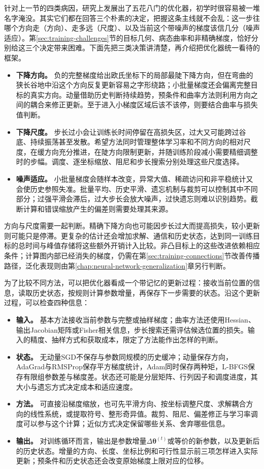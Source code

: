 针对上一节的四类病因，研究上发展出了五花八门的优化器，初学时很容易被一堆名字淹没。其实它们都在回答三个朴素的决定，把握这条主线就不会乱：这一步往哪个方向走（方向）、走多远（尺度）、以及当前这个带噪声的梯度该信几分（噪声适应）。第\ref{sec:training-challenges}节的目标几何、病态曲率和非精确梯度，恰好分别给这三个决定带来困难。下面先把三类决策讲清楚，再介绍把优化器统一看待的框架。
\begin{itemize}
  \item \textbf{下降方向。} 负的完整梯度给出欧氏坐标下的局部最陡下降方向，但在弯曲的狭长谷地中沿这个方向反复更新容易之字形绕路；小批量梯度还会偏离完整目标的真实方向。动量借助历史判断持续趋势，预条件和曲率方法则利用方向之间的耦合来修正更新。至于进入小梯度区域后该不该停，则要结合曲率与损失值判断。
  \item \textbf{下降尺度。} 步长过小会让训练长时间停留在高损失区，过大又可能跨过谷底、持续振荡甚至发散。希望方法同时管理整体学习率和不同方向的相对尺度，在缓方向充分推进，在陡方向限制更新，并随训练阶段减小需要精细调整时的步幅。调度、逐坐标缩放、阻尼和步长搜索分别处理这些尺度选择。
  \item \textbf{噪声适应。} 小批量梯度会随样本改变，异常大值、稀疏访问和非平稳统计又会使历史参照失准。批量平均、历史平滑、遗忘机制与裁剪可以控制其中不同部分；过强平滑会滞后，过大步长会放大噪声，过快遗忘则难以识别趋势。截断计算和错误缩放产生的偏差则需要处理其来源。
\end{itemize}
方向与尺度需要一起判断。精确下降方向也可能因步长过大而提高损失，较小更新则可能只是停滞。更复杂的估计还会增加求解、通信和历史状态，达到同一训练目标的总时间与峰值存储将这些额外开销计入比较。非凸目标上的这些改进依赖相应条件；计算图内部已经消失的梯度，仍需在第\ref{sec:training-connections}节改善传播路径，泛化表现则由第\ref{chap:neural-network-generalization}章另行判断。

为了比较不同方法，可以把优化器看成一个带记忆的更新过程：接收当前位置的信息，读取历史状态，按规则计算参数增量，再保存下一步需要的状态。沿这个更新过程，可以检查四种信息：
\begin{itemize}
  \item \textbf{输入。} 基本方法接收当前参数与完整或抽样梯度；曲率方法还使用Hessian、输出Jacobian矩阵或Fisher相关信息，步长搜索还需评估候选位置的损失。输入的精度、抽样方式和获取成本，限定了方法能作出怎样的判断。
  \item \textbf{状态。} 无动量SGD不保存与参数同规模的历史缓冲；动量保存方向，AdaGrad与RMSProp保存平方梯度统计，Adam同时保存两种矩，L-BFGS保存有限组参数差与梯度差。状态还可能是分层矩阵、行列因子和调度进度，其大小与遗忘方式决定成本和适应速度。
  \item \textbf{方法。} 可直接沿梯度缩放，也可先平滑方向、按坐标调整尺度、求解耦合方向的线性系统，或提取符号、整形奇异值。裁剪、阻尼、偏差修正与学习率调度可以参与这个计算；近似方式决定保留哪些关系、舍弃哪些信息。
  \item \textbf{输出。} 对训练循环而言，输出是参数增量$\Delta\bm\theta^{(t)}$或等价的新参数，以及更新后的历史状态。增量的方向、长度、坐标比例和可行性显示前三项怎样进入实际更新；预条件和历史状态还会改变原始梯度上限对应的位移。
\end{itemize}

